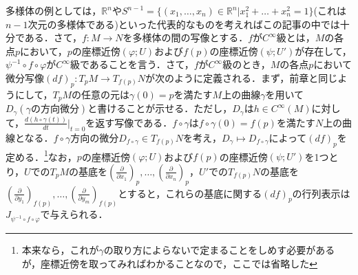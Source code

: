 \documentclass{jsarticle}
\def\realnum{{\mathbb R}}
\def\dfrac{\displaystyle\frac}
\def\delxop{\left(\dfrac{\partial}{\partial x_1}\right)_p}
\def\delxnp{\left(\dfrac{\partial}{\partial x_n}\right)_p}
\def\delyofp{\left(\dfrac{\partial}{\partial y_1}\right)_{f(p)}}
\def\delymfp{\left(\dfrac{\partial}{\partial y_m}\right)_{f(p)}}
\begin{document}
多様体の例としては，$\realnum^n$や$S^{n-1}=\{(x_1,\dots,x_n)\in\realnum^n|x_1^2+\dots+x_n^2=1\}$(これは$n-1$次元の多様体である)といった代表的なものを考えればこの記事の中では十分である．さて，$f:M\rightarrow N$を多様体の間の写像とする．$f$が$C^{\infty}$級とは，$M$の各点$p$において，$p$の座標近傍$(\varphi;U)$および$f(p)$の座標近傍$(\psi;U')$が存在して，$\psi^{-1}\circ f\circ\varphi$が$C^{\infty}$級であることを言う．さて，$f$が$C^{\infty}$級のとき，$M$の各点$p$において微分写像$(df)_p:T_pM\rightarrow T_{f(p)}N$が次のように定義される．まず，前章と同じようにして，$T_pM$の任意の元は$\gamma(0)=p$を満たす$M$上の曲線$\gamma$を用いて$D_\gamma(\gamma の方向微分)$と書けることが示せる．ただし，$D_\gamma$は$h\in C^\infty(M)$に対して，$\dfrac{d(h\circ\gamma(t))}{dt}\Big|_{t=0}$を返す写像である．$f\circ\gamma$は$f\circ\gamma(0)=f(p)$を満たす$N$上の曲線となる．$f\circ\gamma$方向の微分$D_{f\circ\gamma}\in T_{f(p)}N$を考え，$D_{\gamma}\mapsto D_{f\circ\gamma}$によって$(df)_p$を定める．\footnote{本来なら，これが$\gamma$の取り方によらないで定まることをしめす必要があるが，座標近傍を取ってみればわかることなので，ここでは省略した}なお，$p$の座標近傍$(\varphi;U)$および$f(p)$の座標近傍$(\psi;U')$を1つとり，$U$での$T_pM$の基底を$\delxop,\dots,\delxnp$，$U'$での$T_{f(p)}N$の基底を$\delyofp,\dots,\delymfp$とすると，これらの基底に関する$(df)_p$の行列表示は$J_{\psi^{-1}\circ f\circ\varphi}$で与えられる．
\end{document}
